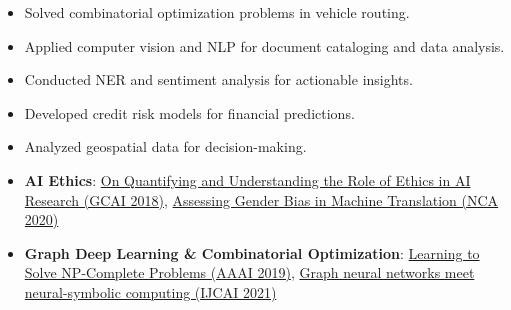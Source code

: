 \documentclass[10pt,a4paper]{altacv}
\begin{document}
{\divider

\begin{itemize}
\item Solved combinatorial optimization problems in vehicle routing.
\item Applied computer vision and NLP for document cataloging and data analysis.
\item Conducted NER and sentiment analysis for actionable insights.
\item Developed credit risk models for financial predictions.
\item Analyzed geospatial data for decision-making.
\end{itemize}

\divider


\begin{itemize}
\item \textbf{AI Ethics}: {\small {\href{http://www.easychair.org/publications/paper/Z7D4}{On Quantifying and Understanding the Role of Ethics in AI Research (GCAI 2018)}}}, {\small {\href{http://arxiv.org/abs/1809.02208}{Assessing Gender Bias in Machine Translation (NCA 2020)}}}
    \item \textbf{Graph Deep Learning \& Combinatorial Optimization}: {\small {\href{http://arxiv.org/abs/1809.02721}{Learning to Solve NP-Complete Problems (AAAI 2019)}}}, {\small {\href{https://arxiv.org/pdf/1903.04598.pdf}{Graph neural networks meet neural-symbolic computing (IJCAI 2021)}}}
\end{itemize}
\divider
}
\end{document}
